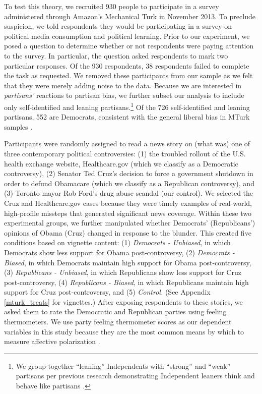 \documentclass[12pt, letterpaper]{article}
\begin{document}
To test this theory, we recruited 930 people to participate in a survey administered through Amazon's Mechanical Turk in November 2013. To preclude suspicion, we told respondents they would be participating in a survey on political media consumption and political learning. Prior to our experiment, we posed a question to determine whether or not respondents were paying attention to the survey. In particular, the question asked respondents to mark two particular responses. Of the 930 respondents, 38 respondents failed to complete the task as requested. We removed these participants from our sample as we felt that they were merely adding noise to the data. Because we are interested in \textit{partisans'} reactions to partisan bias, we further subset our analysis to include only self-identified and leaning partisans.\footnote{We group together ``leaning'' Independents with ``strong'' and ``weak'' partisans per previous research demonstrating Independent leaners think and behave like partisans \citep{keithetal_1992}.} Of the 726 self-identified and leaning partisans, 552 are Democrats, consistent with the general liberal bias in MTurk samples \citep{BerinskyHuberLenz2012}. 

Participants were randomly assigned to read a news story on (what was) one of three contemporary political controversies: (1) the troubled rollout of the U.S. health exchange website, Healthcare.gov (which we classify as a Democratic controversy), (2) Senator Ted Cruz's decision to force a government shutdown in order to defund Obamacare (which we classify as a Republican controversy), and (3) Toronto mayor Rob Ford's drug abuse scandal (our control). We selected the Cruz and Healthcare.gov cases because they were timely examples of real-world, high-profile missteps that generated significant news coverage. Within these two experimental groups, we further manipulated whether Democrats' (Republicans') opinions of Obama (Cruz) changed in response to the blunder. This created five conditions based on vignette content:  (1) \textit{Democrats - Unbiased}, in which Democrats show less support for Obama post-controversy, (2) \textit{Democrats - Biased}, in which Democrats maintain high support for Obama post-controversy, (3) \textit{Republicans - Unbiased}, in which Republicans show less support for Cruz post-controversy, (4) \textit{Republicans - Biased}, in which Republicans maintain high support for Cruz post-controversy, and (5) \textit{Control.} (See Appendix \ref{mturk_treats} for vignettes.) After exposing respondents to these stories, we asked them to rate the Democratic and Republican parties using feeling thermometers. We use party feeling thermometer scores as our dependent variables in this study because they are the most common means by which to measure affective polarization \citep[e.g.,][]{haidthetherington_2012,hetheringtonrudolph_2015,IyengarSoodLelkes2012,IyengarWestwood2014,mason_2015}. 
\end{document}
